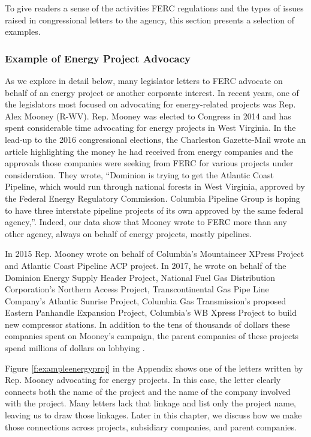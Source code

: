 \documentclass{article}
\begin{document}
To give readers a sense of the activities FERC regulations and the types of issues raised in congressional letters to the agency, this section presents a selection of examples.

\subsubsection{Example of Energy Project Advocacy}

As we explore in detail below, many legislator letters to FERC advocate on behalf of an energy project or another corporate interest. 
In recent years, one of the legislators most focused on advocating for energy-related projects was Rep. Alex Mooney (R-WV).  
Rep. Mooney was elected to Congress in 2014 and has spent considerable time advocating for energy projects in West Virginia. In the lead-up to the 2016 congressional elections, the Charleston Gazette-Mail wrote an article highlighting the money he had received from energy companies and the approvals those companies were seeking from FERC for various projects under consideration.  They wrote, ``Dominion is trying to get the Atlantic Coast Pipeline, which would run through national forests in West Virginia, approved by the Federal Energy Regulatory Commission. Columbia Pipeline Group is hoping to have three interstate pipeline projects of its own approved by the same federal agency,''\citep[pg. 4]{Brown2016cgm}.  Indeed, our data show that Mooney wrote to FERC more than any other agency, always on behalf of energy projects, mostly pipelines. 

In 2015 Rep. Mooney wrote on behalf of Columbia's Mountaineer XPress Project and Atlantic Coast Pipeline ACP project.  In 2017, he wrote on behalf of the Dominion Energy Supply Header Project, National Fuel Gas Distribution Corporation’s Northern Access Project, Transcontinental Gas Pipe Line Company's Atlantic Sunrise Project, Columbia Gas Transmission's proposed Eastern Panhandle Expansion Project, Columbia's WB Xpress Project to build new compressor stations. In addition to the tens of thousands of dollars these companies spent on Mooney's campaign, the parent companies of these projects spend millions of dollars on lobbying \citep{Lobbyview2019}.

Figure \ref{f:exampleenergyproj} in the Appendix shows one of the letters written by Rep. Mooney advocating for energy projects.  In this case, the letter clearly connects both the name of the project and the name of the company involved with the project.  Many letters lack that linkage and list only the project name, leaving us to draw those linkages.  Later in this chapter, we discuss how we make those connections across projects, subsidiary companies, and parent companies.  
\end{document}
